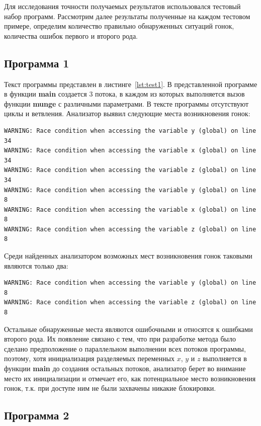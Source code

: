 Для исследования точности получаемых результатов использовался тестовый набор программ. Рассмотрим далее результаты полученные на каждом тестовом примере, определим количество правильно обнаруженных ситуаций гонок, количества ошибок первого и второго рода.

\subsection{Программа 1}

Текст программы представлен в листинге~\ref{lst:test1}. В представленной программе в функции \textbf{main} создается 3 потока, в каждом из которых выполняется вызов функции \textbf{munge} с различными параметрами. В тексте программы отсутствуют циклы и ветвления. Анализатор выявил следующие места возникновения гонок:
\begin{verbatim}
WARNING: Race condition when accessing the variable y (global) on line 34
WARNING: Race condition when accessing the variable x (global) on line 34
WARNING: Race condition when accessing the variable z (global) on line 34
WARNING: Race condition when accessing the variable y (global) on line 8
WARNING: Race condition when accessing the variable x (global) on line 8
WARNING: Race condition when accessing the variable z (global) on line 8
\end{verbatim}
Среди найденных анализатором возможных мест возникновения гонок таковыми являются только два:
\begin{verbatim}
WARNING: Race condition when accessing the variable y (global) on line 8
WARNING: Race condition when accessing the variable z (global) on line 8
\end{verbatim}
Остальные обнаруженные места являются ошибочными и относятся к ошибками второго рода. Их появление связано с тем, что при разработке метода было сделано предположение о параллельном выполнении всех потоков программы, поэтому, хотя инициализация разделяемых переменных $x$, $y$ и $z$ выполняется в функции \textbf{main} до создания остальных потоков, анализатор берет во внимание место их инициализации и отмечает его, как потенциальное место возникновения гонок, т.к. при доступе ним не были захвачены никакие блокировки.



\subsection{Программа 2}

